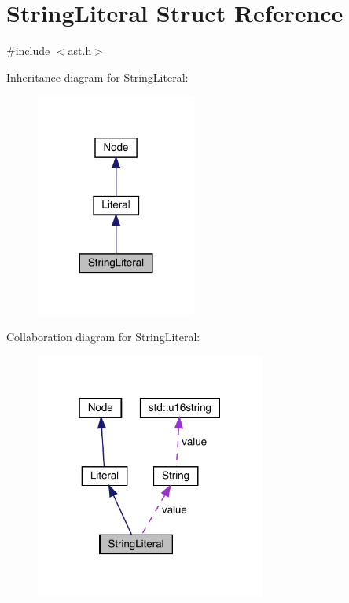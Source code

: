 \hypertarget{struct_string_literal}{}\section{String\+Literal Struct Reference}
\label{struct_string_literal}


{\ttfamily \#include $<$ast.\+h$>$}



Inheritance diagram for String\+Literal\+:\nopagebreak
\begin{figure}[H]
\begin{center}
\leavevmode
\includegraphics[width=149pt]{struct_string_literal__inherit__graph}
\end{center}
\end{figure}


Collaboration diagram for String\+Literal\+:
\nopagebreak
\begin{figure}[H]
\begin{center}
\leavevmode
\includegraphics[width=214pt]{struct_string_literal__coll__graph}
\end{center}
\end{figure}
